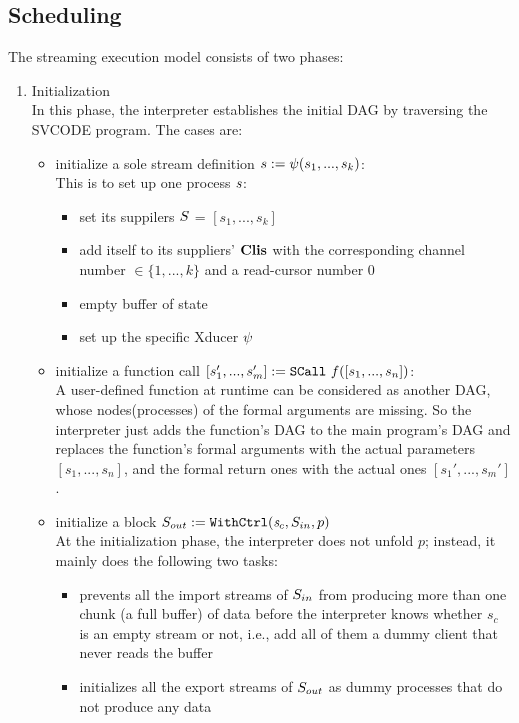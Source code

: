 \subsection{Scheduling}
The streaming execution model consists of two phases:
\begin{enumerate}[(1)]
\item Initialization \\
In this phase, the interpreter establishes the initial DAG by traversing the SVCODE program. The cases are:
\begin{itemize}
	\item initialize a sole stream definition $\sdef{s}{\lcall(s_1,...,s_k)}$: \\
	This is to set up one process $\s$:
	\begin{itemize}
		\item set its suppilers $\S$ = $[s_1,...,s_k]$
		\item add itself to its suppliers' $\clis$ with the corresponding channel number $\in \{1,...,k\}$ and a read-cursor number 0
		\item empty buffer of state \filling
		\item set up the specific Xducer $\lcall$
	\end{itemize}

	
	\item initialize a function call  $\scall{f}{[s_1,...,s_n]}{[s_1',...,s_m']}$: \\
	A user-defined function at runtime can be considered as another DAG, whose nodes(processes) of the formal arguments are missing. 
	So the interpreter just adds the function's DAG to the main program's DAG 
	and replaces the function's formal arguments with the actual parameters $[s_1,...,s_n]$, and the formal return ones with the actual ones $[s_1',...,s_m']$.  

	
	\item initialize a \wc block $\withctrl{\s_c}{p}{\Sin}{\Sout}$ \\
	At the initialization phase, the interpreter does not unfold $p$; instead, it mainly does the following two tasks:	
	\begin{itemize}
		\item prevents all the import streams of $\Sin$ from producing more than one chunk (a full buffer) of data before the interpreter knows whether $s_c$ is an empty stream or not, i.e., add all of them a dummy client that never reads the buffer 
		\item initializes all the export streams of $\Sout$ as dummy processes that do not produce any data
	\end{itemize}


\end{itemize}
\end{enumerate}
